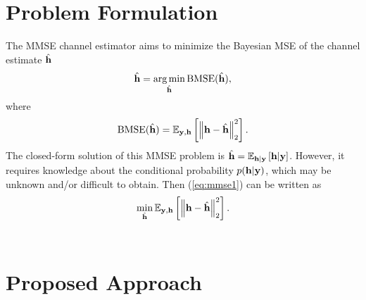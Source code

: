 \documentclass[journal,10pt,twocolumn]{IEEEtran}
\begin{document}
    \section{Problem Formulation}

        The MMSE channel estimator aims to minimize the Bayesian MSE of the channel estimate $\hat{{\bf h}}$ 
        \begin{equation} \label{eq:mmse1}
            \hat{{\bf h}} = \operatorname*{arg\,min}_{\hat{{\bf h}}} \mathrm{BMSE}(\hat{{\bf h}}),
        \end{equation}
        where
        \begin{equation} \label{eq:bmse}
            \mathrm{BMSE}(\hat{{\bf h}}) = \mathbb{E}_{{\bf y},{\bf h}}\left[\left\| {\bf h}-\hat{{\bf h}} \right\|^2_2\right].
        \end{equation}
        The closed-form solution of this MMSE problem is $\hat{{\bf h}} = \mathbb{E}_{{\bf h}|{\bf y}}\left[{\bf h}|{\bf y}\right]$. However, it requires knowledge about the conditional probability
        $p({\bf h}|{\bf y})$, which may be unknown and/or difficult to obtain. Then (\ref{eq:mmse1}) can be written as
        \begin{equation} \label{eq:mmse2}
            \min_{\hat{{\bf h}}} \mathbb{E}_{{\bf y},{\bf h}}\left[\left\| {\bf h}-\hat{{\bf h}} \right\|^2_2\right].
        \end{equation}\\

    \section{Proposed Approach}
\end{document}
